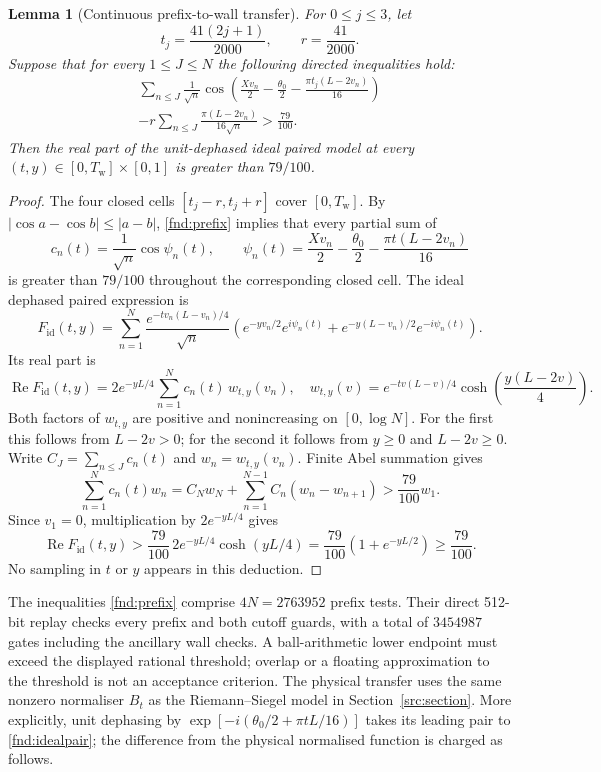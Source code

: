 \documentclass[11pt,a4paper]{article}
\newtheorem{lemma}[theorem]{Lemma}
\theoremstyle{definition}
\theoremstyle{remark}
\newcommand{\Ree}{\operatorname{Re}}
\begin{document}
\begin{lemma}[Continuous prefix-to-wall transfer]\label{fnd:abel}
For $0\leq j\leq3$, let
\[
 t_j=\frac{41(2j+1)}{2000},\qquad r=\frac{41}{2000}.
\]
Suppose that for every $1\leq J\leq N$ the following directed inequalities
hold:
\begin{multline}
 \sum_{n\leq J}\frac1{\sqrt n}
 \cos\left(\frac{Xv_n}{2}-\frac{\theta_0}{2}
            -\frac{\pi t_j(L-2v_n)}{16}\right)\\
 -r\sum_{n\leq J}\frac{\pi(L-2v_n)}{16\sqrt n}
 >\frac{79}{100}.
 \label{fnd:prefix}
\end{multline}
Then the real part of the unit-dephased ideal paired model at every
$(t,y)\in[0,T_{\mathrm w}]\times[0,1]$ is greater than $79/100$.
\end{lemma}
\begin{proof}
The four closed cells $[t_j-r,t_j+r]$ cover $[0,T_{\mathrm w}]$.
By $|\cos a-\cos b|\leq|a-b|$, \eqref{fnd:prefix} implies that every
partial sum of
\[
 c_n(t)=\frac1{\sqrt n}\cos\psi_n(t),\qquad
 \psi_n(t)=\frac{Xv_n}{2}-\frac{\theta_0}{2}
                  -\frac{\pi t(L-2v_n)}{16}
\]
is greater than $79/100$ throughout the corresponding closed cell.
The ideal dephased paired expression is
\begin{equation}
 F_{\mathrm{id}}(t,y)=\sum_{n=1}^N\frac{e^{-tv_n(L-v_n)/4}}{\sqrt n}
 \left(e^{-yv_n/2}e^{i\psi_n(t)}
       +e^{-y(L-v_n)/2}e^{-i\psi_n(t)}\right).
 \label{fnd:idealpair}
\end{equation}
Its real part is
\begin{equation}
 \Ree F_{\mathrm{id}}(t,y)
 =2e^{-yL/4}\sum_{n=1}^N c_n(t)\,w_{t,y}(v_n),
 \quad
 w_{t,y}(v)=e^{-tv(L-v)/4}\cosh\left(\frac{y(L-2v)}4\right).
 \label{fnd:idealreal}
\end{equation}
Both factors of $w_{t,y}$ are positive and nonincreasing on $[0,\log N]$.
For the first this follows from $L-2v>0$; for the second it follows from
$y\geq0$ and $L-2v\geq0$. Write $C_J=\sum_{n\leq J}c_n(t)$ and
$w_n=w_{t,y}(v_n)$. Finite Abel summation gives
\[
 \sum_{n=1}^N c_n(t)w_n
 =C_Nw_N+\sum_{n=1}^{N-1}C_n(w_n-w_{n+1})
 >\frac{79}{100}w_1.
\]
Since $v_1=0$, multiplication by $2e^{-yL/4}$ gives
\[
 \Ree F_{\mathrm{id}}(t,y)
 >\frac{79}{100}\,2e^{-yL/4}\cosh(yL/4)
 =\frac{79}{100}(1+e^{-yL/2})\geq\frac{79}{100}.
\]
No sampling in $t$ or $y$ appears in this deduction.
\end{proof}

The inequalities \eqref{fnd:prefix} comprise $4N=2763952$ prefix tests.
Their direct 512-bit replay checks every prefix and both cutoff guards,
with a total of $3454987$ gates including the ancillary wall checks.
A ball-arithmetic lower endpoint must exceed the displayed rational
threshold; overlap or a floating approximation to the threshold is not
an acceptance criterion. The physical transfer uses the same nonzero
normaliser $B_t$ as the Riemann--Siegel model in
Section~\ref{src:section}. More explicitly, unit dephasing by
$\exp[-i(\theta_0/2+\pi tL/16)]$ takes its leading pair to
\eqref{fnd:idealpair}; the difference from the physical normalised function
is charged as follows.
\end{document}
